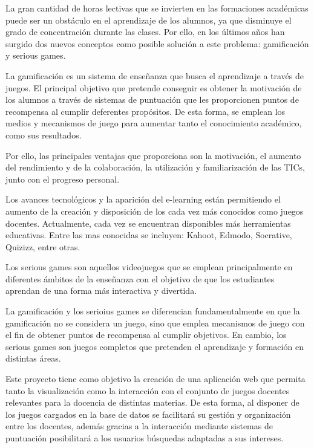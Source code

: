 
La gran cantidad de horas lectivas que se invierten en las formaciones académicas puede ser un obstáculo en el aprendizaje de los alumnos, ya que disminuye el grado de concentración durante las clases. Por ello, en los últimos años han surgido dos nuevos conceptos como posible solución a este problema: gamificación y serious games.

La gamificación es un sistema de enseñanza que busca el aprendizaje a través de juegos. El principal objetivo que pretende conseguir es obtener la motivación de los alumnos a través de sistemas de puntuación que les proporcionen puntos de recompensa al cumplir deferentes propósitos. De esta forma, se emplean los medios y mecanismos de juego para aumentar tanto el conocimiento académico, como sus resultados. 

Por ello, las principales ventajas que proporciona son la motivación, el aumento del rendimiento y de la colaboración, la utilización y familiarización de las TICs, junto con el progreso personal.

Los avances tecnológicos y la aparición del e-learning están permitiendo el aumento de la creación y disposición de los cada vez más conocidos como juegos docentes. Actualmente, cada vez se encuentran disponibles más herramientas educativas. Entre las mas conocidas se incluyen: Kahoot, Edmodo, Socrative, Quizizz, entre otras.

Los serious games son aquellos videojuegos que se emplean principalmente en diferentes ámbitos de la enseñanza con el objetivo de que los estudiantes aprendan de una forma más interactiva y divertida. 

La gamificación y los serioius games se diferencian fundamentalmente en que la gamificación no se considera un juego, sino que emplea mecanismos de juego con el fin de obtener puntos de recompensa al cumplir objetivos. En cambio, los serious games son juegos completos que pretenden el aprendizaje y formación en distintas áreas.


Este proyecto tiene como objetivo la creación de una aplicación web que permita tanto la visualización como la interacción con el conjunto de juegos docentes relevantes para la docencia de distintas materias. De esta forma, al disponer de los juegos cargados en la base de datos se facilitará su gestión y organización entre los docentes, además gracias a la interacción mediante sistemas de puntuación posibilitará a los usuarios búsquedas adaptadas a sus intereses.

